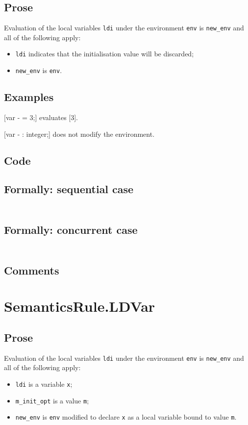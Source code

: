 \documentclass{book}
\begin{document}
    \subsection{Prose}
Evaluation of the local variables \texttt{ldi} under the environment
\texttt{env} is \texttt{new\_env} and all of the following apply:
    \begin{itemize}
    \item \texttt{ldi} indicates that the initialisation value will be discarded;
    \item \texttt{new\_env} is \texttt{env}.
    \end{itemize}

    \subsection{Examples}
    [var - = 3;] evaluates [3].

    [var - : integer;] does not modify the environment.

  \subsection{Code}

  \subsection{Formally: sequential case}
  \begin{align}
  \end{align} 

  \subsection{Formally: concurrent case}
  \begin{align}
  \end{align} 

    \subsection{Comments}

\section{SemanticsRule.LDVar \label{sec:SemanticsRule.LDVar}}

    \subsection{Prose}
Evaluation of the local variables \texttt{ldi} under the environment
\texttt{env} is \texttt{new\_env} and all of the following apply:
    \begin{itemize}
    \item \texttt{ldi} is a variable \texttt{x};
    \item \texttt{m\_init\_opt} is a value \texttt{m};
    \item \texttt{new\_env} is \texttt{env} modified to declare \texttt{x} as a
local variable bound to value \texttt{m}.
    \end{itemize}
\end{document}
